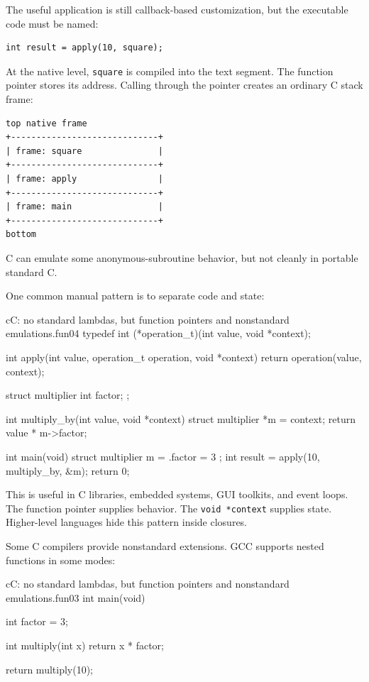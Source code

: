 The useful application is still callback-based customization, but the executable code must be named:

\begin{verbatim}
int result = apply(10, square);
\end{verbatim}

At the native level, \texttt{square} is compiled into the text segment. The function pointer stores its address. Calling through the pointer creates an ordinary C stack frame:

\begin{verbatim}
top native frame
+-----------------------------+
| frame: square               |
+-----------------------------+
| frame: apply                |
+-----------------------------+
| frame: main                 |
+-----------------------------+
bottom
\end{verbatim}

C can emulate some anonymous-subroutine behavior, but not cleanly in portable standard C.

One common manual pattern is to separate code and state:

\begin{codebox}[]{c}{C: no standard lambdas, but function pointers and nonstandard emulations.}{fun04}
typedef int (*operation_t)(int value, void *context);

int apply(int value, operation_t operation, void *context) {
    return operation(value, context);
}

struct multiplier {
    int factor;
};

int multiply_by(int value, void *context) {
    struct multiplier *m = context;
    return value * m->factor;
}

int main(void) {
    struct multiplier m = { .factor = 3 };
    int result = apply(10, multiply_by, &m);
    return 0;
}
\end{codebox}


This is useful in C libraries, embedded systems, GUI toolkits, and event loops. The function pointer supplies behavior. The \texttt{void *context} supplies state. Higher-level languages hide this pattern inside closures.

Some C compilers provide nonstandard extensions. GCC supports nested functions in some modes:

\begin{codebox}[]{c}{C: no standard lambdas, but function pointers and nonstandard emulations.}{fun03}
int main(void) {
    int factor = 3;

    int multiply(int x) {
        return x * factor;
    }

    return multiply(10);
}
\end{codebox}


